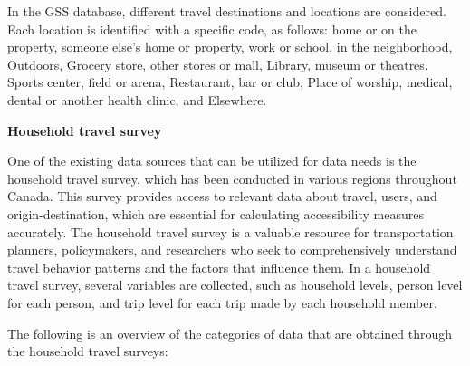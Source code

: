 \documentclass[
11pt, %
oneside, %
english, %
singlespacing, %
]{macthesis} %
\begin{document}
In the GSS database, different travel destinations and locations are considered. Each location is identified with a specific code, as follows: home or on the property, someone else's home or property, work or school, in the neighborhood, Outdoors, Grocery store, other stores or mall, Library, museum or theatres, Sports center, field or arena, Restaurant, bar or club, Place of worship, medical, dental or another health clinic, and Elsewhere.

\textbf{Household travel survey}

One of the existing data sources that can be utilized for data needs is the household travel survey, which has been conducted in various regions throughout Canada. This survey provides access to relevant data about travel, users, and origin-destination, which are essential for calculating accessibility measures accurately. The household travel survey is a valuable resource for transportation planners, policymakers, and researchers who seek to comprehensively understand travel behavior patterns and the factors that influence them. In a household travel survey, several variables are collected, such as household levels, person level for each person, and trip level for each trip made by each household member.

The following is an overview of the categories of data that are obtained through the household travel surveys:
\end{document}
